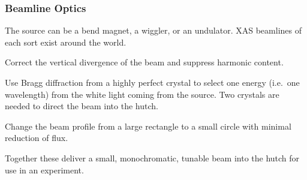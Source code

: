 \documentclass[10pt, xcolor=x11names, compress]{beamer}
\begin{document}
\begin{frame}
  \frametitle{Beamline Optics}

  \begin{description}
  \item[Source] The source can be a bend magnet, a wiggler, or an
    undulator.  XAS beamlines of each sort exist around the world.
  \item[Collimating mirror] Correct the vertical divergence of the
    beam and suppress harmonic content.
  \item[Monochromator] Use Bragg diffraction from a highly perfect
    crystal to select one energy (i.e.\ one wavelength) from the white
    light coming from the source.  Two crystals are needed to direct
    the beam into the hutch.
  \item[Focussing mirror] Change the beam profile from a large
    rectangle to a small circle with minimal reduction of flux.
  \end{description}

  \begin{block}{}
    \begin{center}
      Together these deliver a small, monochromatic, tunable beam into
      the hutch for use in an experiment.
    \end{center}
  \end{block}
\end{frame}
\end{document}
